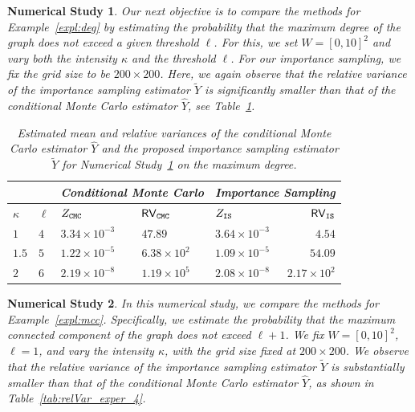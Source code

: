 \documentclass[pdflatex, sn-mathphys-ay]{sn-jnl}%
\newcommand{\wt}{\widetilde}
\newcommand{\wh}{\widehat}
\newtheorem{experiment}{Numerical Study}
\theoremstyle{thmstyleone}%
\theoremstyle{thmstyletwo}%
\theoremstyle{thmstylethree}%
\begin{document}
\begin{experiment}
\label{exper-3}
\normalfont
Our next objective is to compare the methods for Example~\ref{expl:deg} by estimating the probability that the maximum degree of the graph does not exceed a given threshold $\ell$. For this, we set $W = [0, 10]^2$ and vary both the intensity $\kappa$ and the threshold $\ell$. For our importance sampling, we fix the grid size to be $200 \times 200$. Here, we again observe that the relative variance of the importance sampling estimator $\wt Y$ is significantly smaller than that of the conditional Monte Carlo estimator $\wh Y$, see Table~\ref{tab:relVar_exper_3}.

\begin{table}[h]
\caption{Estimated mean and relative variances of the conditional Monte Carlo estimator $\wh Y$ and the proposed importance sampling estimator $\wt Y$ for Numerical Study~\ref{exper-3} on the maximum degree.} 
\label{tab:relVar_exper_3}
\centering
\begin{tabular}{@{}lllllr@{}}
    \hline
	  &  & \multicolumn{2}{l}{Conditional Monte Carlo}
            & \multicolumn{2}{l}{Importance Sampling}
                    \\
    \hline 
     $\kappa$      & $\ell$    &  $Z_{\tt CMC}$  &  ${\sf RV}_{\tt CMC}$   &   $Z_{\tt IS}$  &  ${\sf RV}_{\tt IS}$ \\  
    \hline
$1$   & $4$ &  $3.34 \times 10^{-3}$ & $47.89$ &   $3.64 \times 10^{-3}$ & $4.54$        \\
    \hline
$1.5$   & $5$ &  $1.22 \times 10^{-5}$ & $6.38 \times 10^{2}$ &   $1.09 \times 10^{-5}$ & $54.09$      \\
    \hline
$2$  & $6$ &   $2.19 \times 10^{-8}$ & $1.19 \times 10^{5}$ &   $2.08 \times 10^{-8}$ & $2.17 \times 10^{2}$         \\
    \hline
\end{tabular}
\end{table}
\end{experiment}

\begin{experiment}
 
\label{exper-4}
\normalfont
In this numerical study, we compare the methods for Example~\ref{expl:mcc}. Specifically, we estimate the probability that the maximum connected component of the graph does not exceed $\ell + 1$. We fix $W = [0, 10]^2$, $\ell = 1$, and vary the intensity $\kappa$, with the grid size fixed at $200 \times 200$. We observe that the relative variance of the importance sampling estimator $\wt{Y}$ is substantially smaller than that of the conditional Monte Carlo estimator $\wh{Y}$, as shown in Table~\ref{tab:relVar_exper_4}.
\end{experiment}
\end{document}
